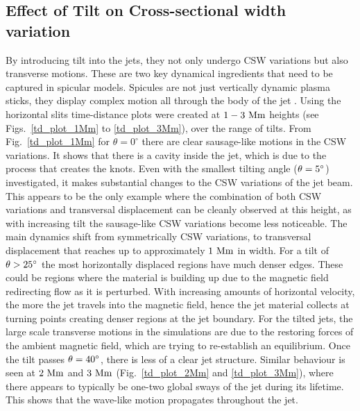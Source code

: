 \subsection{Effect of Tilt on Cross-sectional width variation}
\label{subsec:oscillating}
By introducing tilt into the jets, they not only undergo CSW variations but also transverse motions. These are two key dynamical ingredients that need to be captured in spicular models. Spicules are not just vertically dynamic plasma sticks, they display complex motion all through the body of the jet \citep{Sharma2018ApJ85361S}. \np
%
Using the horizontal slits time-distance plots were created at $1-3~\rm{Mm}$ heights (see Figs.~\ref{td_plot_1Mm} to \ref{td_plot_3Mm}), over the range of tilts. From Fig.~\ref{td_plot_1Mm} for $\theta=0^{\circ}$ there are clear sausage-like motions in the CSW variations. It shows that there is a cavity inside the jet, which is due to the process that creates the knots. Even with the smallest tilting angle ($\theta=5^{\circ}$) investigated, it makes substantial changes to the CSW variations of the jet beam. This appears to be the only example where the combination of both CSW variations and transversal displacement can be cleanly observed at this height, as with increasing tilt the sausage-like CSW variations become less noticeable. The main dynamics shift from symmetrically CSW variations, to transversal displacement that reaches up to approximately $1~\rm{Mm}$ in width. For a tilt of $\theta>25^{\circ}$ the most horizontally displaced regions have much denser edges. These could be regions where the material is building up due to the magnetic field redirecting flow as it is perturbed. With increasing amounts of horizontal velocity, the more the jet travels into the magnetic field, hence the jet material collects at turning points creating denser regions at the jet boundary. For the tilted jets, the large scale transverse motions in the simulations are due to the restoring forces of the ambient magnetic field, which are trying to re-establish an equilibrium. Once the tilt passes $\theta=40^{\circ}$, there is less of a clear jet structure. Similar behaviour is seen at $2~\rm{Mm}$ and $3~\rm{Mm}$ (Fig.~\ref{td_plot_2Mm} and \ref{td_plot_3Mm}), where there appears to typically be one-two global sways of the jet during its lifetime. This shows that the wave-like motion propagates throughout the jet. \np
%
